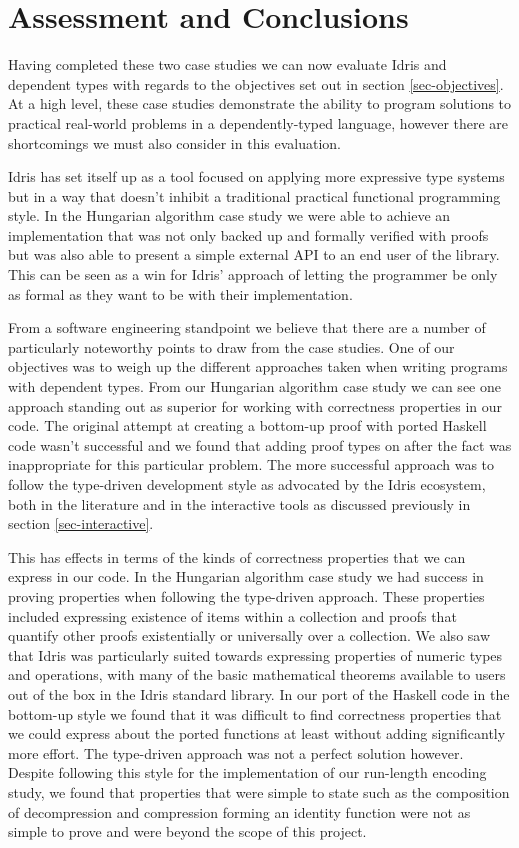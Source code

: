 \documentclass[a4paper, notitlepage]{report}
\begin{document}
\chapter{Assessment and Conclusions}
\label{sec:orgf0a4eaf}

Having completed these two case studies we can now evaluate Idris and dependent
types with regards to the objectives set out in section \ref{sec-objectives}. At a
high level, these case studies demonstrate the ability to program solutions to
practical real-world problems in a dependently-typed language, however there are
shortcomings we must also consider in this evaluation.

Idris has set itself up as a tool focused on applying more expressive type
systems but in a way that doesn't inhibit a traditional practical functional
programming style. In the Hungarian algorithm case study we were able to achieve
an implementation that was not only backed up and formally verified with proofs
but was also able to present a simple external API to an end user of the
library. This can be seen as a win for Idris' approach of letting the programmer
be only as formal as they want to be with their implementation.

From a software engineering standpoint we believe that there are a number of
particularly noteworthy points to draw from the case studies. One of our
objectives was to weigh up the different approaches taken when writing programs
with dependent types. From our Hungarian algorithm case study we can see one
approach standing out as superior for working with correctness properties in our
code. The original attempt at creating a bottom-up proof with ported Haskell
code wasn't successful and we found that adding proof types on after the fact
was inappropriate for this particular problem. The more successful approach was
to follow the type-driven development style as advocated by the Idris ecosystem,
both in the literature \cite{brady_book_2017} and in the interactive tools as
discussed previously in section \ref{sec-interactive}.

This has effects in terms of the kinds of correctness properties that we can
express in our code. In the Hungarian algorithm case study we had success in
proving properties when following the type-driven approach. These properties
included expressing existence of items within a collection and proofs that
quantify other proofs existentially or universally over a collection. We also
saw that Idris was particularly suited towards expressing properties of numeric
types and operations, with many of the basic mathematical theorems available to
users out of the box in the Idris standard library. In our port of the Haskell
code in the bottom-up style we found that it was difficult to find correctness
properties that we could express about the ported functions at least without
adding significantly more effort. The type-driven approach was not a perfect
solution however. Despite following this style for the implementation of our
run-length encoding study, we found that properties that were simple to state
such as the composition of decompression and compression forming an identity
function were not as simple to prove and were beyond the scope of this project.
\end{document}
